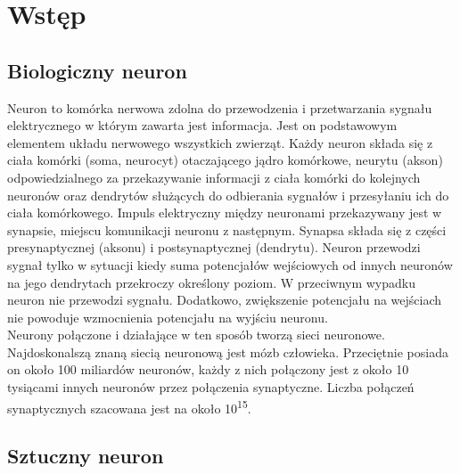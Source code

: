
\chapter{Wstęp}

\section{Biologiczny neuron}

Neuron to komórka nerwowa zdolna do przewodzenia i przetwarzania sygnału
elektrycznego w którym zawarta jest informacja. Jest on podstawowym elementem
układu nerwowego wszystkich zwierząt. Każdy neuron składa się z
ciała komórki (soma, neurocyt) otaczającego jądro komórkowe, neurytu (akson)
odpowiedzialnego za przekazywanie informacji z ciała komórki do kolejnych neuronów
oraz dendrytów służących do odbierania sygnałów i przesyłaniu ich do ciała
komórkowego. Impuls elektryczny między neuronami przekazywany jest
w synapsie, miejscu komunikacji neuronu z następnym. Synapsa składa się
z części presynaptycznej (aksonu) i postsynaptycznej (dendrytu). Neuron
przewodzi sygnał tylko w sytuacji kiedy suma potencjałów wejściowych od innych
neuronów na jego dendrytach przekroczy określony poziom. W przeciwnym wypadku
neuron nie przewodzi sygnału. Dodatkowo, zwiększenie potencjału na wejściach
nie powoduje wzmocnienia potencjału na wyjściu neuronu.\\
Neurony połączone i działające w ten sposób tworzą sieci neuronowe. Najdoskonalszą
znaną siecią neuronową jest mózb człowieka. Przeciętnie posiada on około 100
miliardów neuronów, każdy z nich połączony jest z około 10 tysiącami innych
neuronów przez połączenia synaptyczne. Liczba połączeń synaptycznych szacowana
jest na około 10\textsuperscript{15}.

\section{Sztuczny neuron}

